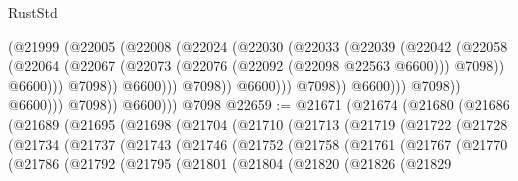 \begin{lexlean}{RustStd}
\begin{coremodule}
                                        (@21999
                                          (@22005
                                            (@22008
                                              (@22024
                                                (@22030
                                                  (@22033
                                                    (@22039
                                                      (@22042
                                                        (@22058
                                                          (@22064
                                                            (@22067
                                                              (@22073
                                                                (@22076
                                                                  (@22092 (@22098 @22563 @6600)))
                                                                @7098))
                                                            @6600)))
                                                      @7098))
                                                  @6600)))
                                            @7098))
                                        @6600)))
                                  @7098))
                              @6600)))
                        @7098))
                    @6600)))
              @7098))
          @6600)))
    @7098
@22659 := @21671
    (@21674
      (@21680
        (@21686
          (@21689
            (@21695
              (@21698
                (@21704
                  (@21710
                    (@21713
                      (@21719
                        (@21722
                          (@21728
                            (@21734
                              (@21737
                                (@21743
                                  (@21746
                                    (@21752
                                      (@21758
                                        (@21761
                                          (@21767
                                            (@21770
                                              (@21786
                                                (@21792
                                                  (@21795
                                                    (@21801
                                                      (@21804
                                                        (@21820
                                                          (@21826
                                                            (@21829

\end{coremodule}
\end{lexlean}
